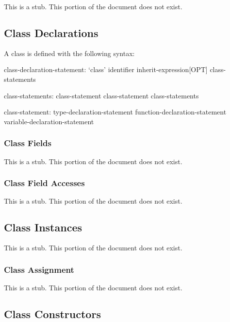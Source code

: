 \label{Classes}

This is a stub.  This portion of the document does not exist.

\subsection{Class Declarations}
\label{Class_Declarations}

A class is defined with the following syntax:
\begin{syntax}
class-declaration-statement:
  `class' identifier inherit-expression[OPT] {
    class-statements }

class-statements:
  class-statement
  class-statement class-statements

class-statement:
  type-declaration-statement
  function-declaration-statement
  variable-declaration-statement
\end{syntax}

\subsubsection{Class Fields}
\label{Class_Fields}

This is a stub.  This portion of the document does not exist.

\subsubsection{Class Field Accesses}
\label{Class_Field_Accesses}

This is a stub.  This portion of the document does not exist.

\subsection{Class Instances}
\label{Class_Instances}

This is a stub.  This portion of the document does not exist.

\subsubsection{Class Assignment}
\label{Class_Assignment}

This is a stub.  This portion of the document does not exist.

\subsection{Class Constructors}
\label{Class_Constructors}


